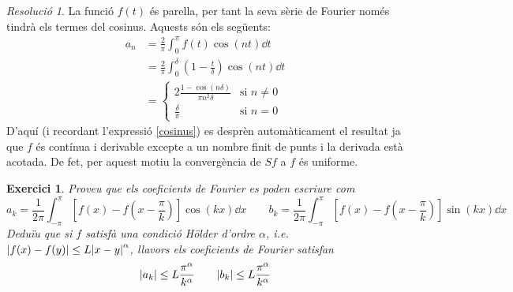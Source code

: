 \documentclass[10pt,a4paper]{article}
\newtheorem{exercici}{Exercici}
\theoremstyle{definition}
\theoremstyle{remark}
\newtheorem*{res}{Resolució}
\begin{document}
\begin{res}
  La funció $f(t)$ és parella, per tant la seva sèrie de Fourier només tindrà els termes del cosinus. Aquests són els següents:
  \begin{align*}
    a_n & =\frac{2}{\pi}\int_0^\pi f(t)\cos(nt)\dd{t}                                \\
        & =\frac{2}{\pi}\int_0^\delta \left(1-\frac{t}{\delta}\right)\cos(nt)\dd{t}  \\
        & =\begin{cases}
             \displaystyle 2\frac{1-\cos(n\delta)}{\pi n^2\delta} & \text{si $n\ne 0$} \\
             \frac{\delta}{\pi}                                   & \text{si $n=0$}
           \end{cases}
  \end{align*}
  D'aquí (i recordant l'expressió \eqref{cosinus}) es desprèn automàticament el resultat ja que $f$ és contínua i derivable excepte a un nombre finit de punts i la derivada està acotada. De fet, per aquest motiu la convergència de $Sf$ a $f$ és uniforme.
\end{res}
\begin{exercici}
  Proveu que els coeficients de Fourier es poden escriure com $$a_k=\frac{1}{2\pi}\int_{-\pi}^\pi\left[f(x)-f\left(x-\frac{\pi}{k}\right)\right]\cos(kx)\dd{x}\qquad b_k=\frac{1}{2\pi}\int_{-\pi}^\pi\left[f(x)-f\left(x-\frac{\pi}{k}\right)\right]\sin(kx)\dd{x}$$
  Deduïu que si $f$ satisfà una condició Hölder d'ordre $\alpha$, i.e. $\abs{f(x)-f(y)}\leq L\abs{x-y}^\alpha$, llavors els coeficients de Fourier satisfan $$\abs{a_k}\leq L\frac{\pi^\alpha}{k^\alpha}\qquad\abs{b_k}\leq L\frac{\pi^\alpha}{k^\alpha}$$
\end{exercici}
\end{document}
